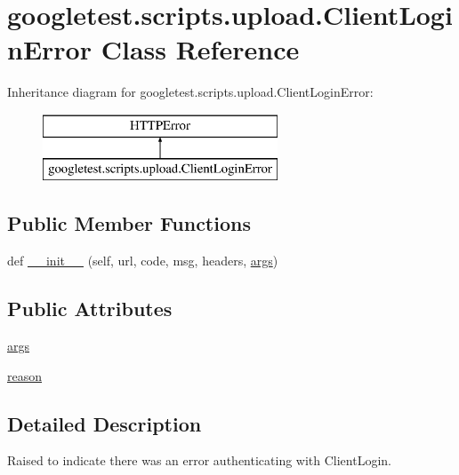 \hypertarget{classgoogletest_1_1scripts_1_1upload_1_1_client_login_error}{}\section{googletest.\+scripts.\+upload.\+Client\+Login\+Error Class Reference}
\label{classgoogletest_1_1scripts_1_1upload_1_1_client_login_error}
Inheritance diagram for googletest.\+scripts.\+upload.\+Client\+Login\+Error\+:\begin{figure}[H]
\begin{center}
\leavevmode
\includegraphics[height=2.000000cm]{dc/da3/classgoogletest_1_1scripts_1_1upload_1_1_client_login_error}
\end{center}
\end{figure}
\subsection*{Public Member Functions}
\begin{DoxyCompactItemize}
\item 
def \mbox{\hyperlink{classgoogletest_1_1scripts_1_1upload_1_1_client_login_error_ae5d4e1b22dd9166626a9cdfea49c80f2}{\+\_\+\+\_\+init\+\_\+\+\_\+}} (self, url, code, msg, headers, \mbox{\hyperlink{classgoogletest_1_1scripts_1_1upload_1_1_client_login_error_a18ab0f6c692a795c9f4c9496d5e1451b}{args}})
\end{DoxyCompactItemize}
\subsection*{Public Attributes}
\begin{DoxyCompactItemize}
\item 
\mbox{\hyperlink{classgoogletest_1_1scripts_1_1upload_1_1_client_login_error_a18ab0f6c692a795c9f4c9496d5e1451b}{args}}
\item 
\mbox{\hyperlink{classgoogletest_1_1scripts_1_1upload_1_1_client_login_error_ad7964a419b3fc3e4cb519d8bb71bbce6}{reason}}
\end{DoxyCompactItemize}


\subsection{Detailed Description}
\begin{DoxyVerb}Raised to indicate there was an error authenticating with ClientLogin.\end{DoxyVerb}
 

